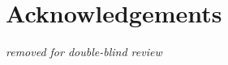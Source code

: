\documentclass[pldi]{sigplanconf-pldi15}
\begin{document}
\section{Acknowledgements}

{\em removed for double-blind review}



{}
\end{document}
